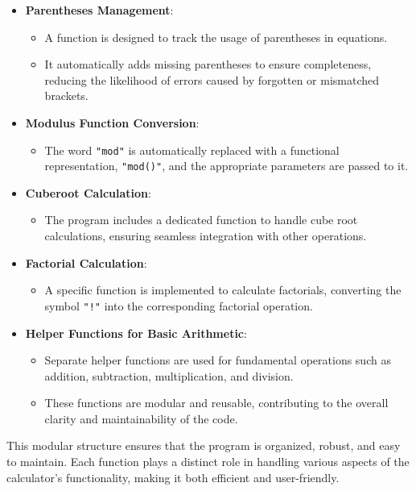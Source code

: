 \documentclass[a4paper,12pt]{article}
\begin{document}
\begin{itemize}
    \item \textbf{Parentheses Management}:
    \begin{itemize}
        \item A function is designed to track the usage of parentheses in equations.
        \item It automatically adds missing parentheses to ensure completeness, reducing the likelihood of errors caused by forgotten or mismatched brackets.
    \end{itemize}
    
    \item \textbf{Modulus Function Conversion}:
    \begin{itemize}
        \item The word \texttt{"mod"} is automatically replaced with a functional representation, \texttt{"mod()"}, and the appropriate parameters are passed to it.
    \end{itemize}
    
    \item \textbf{Cuberoot Calculation}:
    \begin{itemize}
        \item The program includes a dedicated function to handle cube root calculations, ensuring seamless integration with other operations.
    \end{itemize}
    
    \item \textbf{Factorial Calculation}:
    \begin{itemize}
        \item A specific function is implemented to calculate factorials, converting the symbol \texttt{"!"} into the corresponding factorial operation.
    \end{itemize}
    
    \item \textbf{Helper Functions for Basic Arithmetic}:
    \begin{itemize}
        \item Separate helper functions are used for fundamental operations such as addition, subtraction, multiplication, and division.
        \item These functions are modular and reusable, contributing to the overall clarity and maintainability of the code.
    \end{itemize}
\end{itemize}

This modular structure ensures that the program is organized, robust, and easy to maintain. Each function plays a distinct role in handling various aspects of the calculator's functionality, making it both efficient and user-friendly.
\end{document}
